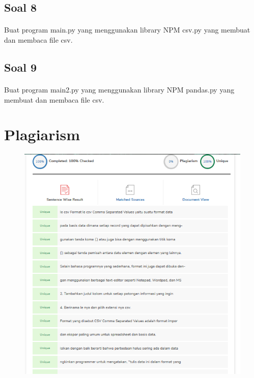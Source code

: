 \documentclass[a4paper,12pt]{report}
\begin{document}
\subsection*{Soal 8}
\paragraph{}Buat program main.py yang menggunakan library NPM csv.py yang membuat dan membaca file csv.


\subsection*{Soal 9}
\paragraph{}Buat program main2.py yang menggunakan library NPM pandas.py yang membuat dan membaca file csv.

        
\section*{Plagiarism}
\begin{figure}[h]
\begin{center}
\includegraphics[scale=0.8]{gambar/11.png}
\end{center}
\end{figure}
 
        
        
        
        
\end{document}
